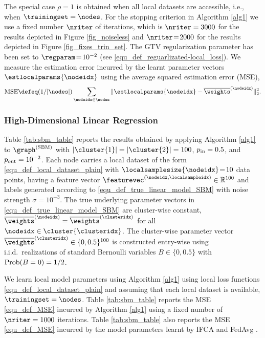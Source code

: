\documentclass[lettersize,journal]{IEEEtran}
\newcommand{\estmse}{{\rm MSE}}
\begin{document}
The special case $\rho=1$ is obtained when all local datasets are accessible, i.e., when $\trainingset = \nodes$. 
For the stopping criterion in Algorithm \ref{alg1} we use a fixed number $\nriter$ of iterations, which 
is $\nriter=3000$ for the results depicted in Figure \ref{fig_noiseless} and $\nriter\!=\!2000$ for 
the results depicted in Figure \ref{fig_fixes_trin_set}. The GTV regularization parameter has 
been set to $\regparam\!=\!10^{-2}$ (see \eqref{equ_def_reguarlizated-local_loss}). We measure 
the estimation error incurred by the learnt parameter vectors $\estlocalparams{\nodeidx}$ using the 
average squared estimation error (MSE), 
\begin{equation}
	\label{equ_def_MSE}
	\estmse \defeq (1/|\nodes|) \sum_{\nodeidx \in \nodes} \|\estlocalparams{\nodeidx}-\overline{\weights}^{(\nodeidx)} \|_{2}^{2}. 
 \vspace{-2mm}
\end{equation} 

\subsubsection{High-Dimensional Linear Regression}

Table \ref{tab:sbm_table} reports the results obtained by applying Algorithm \ref{alg1} to $\graph^{(\rm SBM)}$ with 
$|\cluster{1}| = |\cluster{2}| = 100$, $p_{\rm in}=0.5$, and $p_{\rm out}=10^{-2}$. Each node carries a local dataset 
of the form \eqref{equ_def_local_dataset_plain} with $\localsamplesize{\nodeidx}\!=\!10$ data points, having a feature vector  
$\featurevec^{(\nodeidx,\localsampleidx)} \in \mathbb{R}^{100}$ and labels generated according to \eqref{equ_def_true_linear_model_SBM} 
with noise strength $\sigma=10^{-3}$. The true underlying parameter vectors in \eqref{equ_def_true_linear_model_SBM} 
are cluster-wise constant, $\overline{\weights}^{(\nodeidx)} = \overline{\weights}^{(\clusteridx)}$ for all $\nodeidx \in \cluster{\clusteridx}$. 
The cluster-wise parameter vector $\overline{\weights}^{(\clusteridx)} \in \{0,0.5\}^{100}$ is constructed entry-wise 
using i.i.d.\ realizations of standard Bernoulli variables $B \in \{0, 0.5\}$ with ${\rm Prob}(B=0)=1/2$. 

We learn local model parameters using Algorithm \ref{alg1} using local loss functions \eqref{equ_def_local_dataset_plain} and 
assuming that each local dataset is available, $\trainingset = \nodes$. Table \ref{tab:sbm_table} 
reports the MSE \eqref{equ_def_MSE} incurred by Algorithm \ref{alg1} using a fixed number of $\nriter=1000$ iterations. 
Table \ref{tab:sbm_table} also reports the MSE \eqref{equ_def_MSE} incurred by the model parameters 
learnt by IFCA \cite{Ghosh2020} and FedAvg \cite{Sun2021DecentralizedFA}. 
\end{document}
